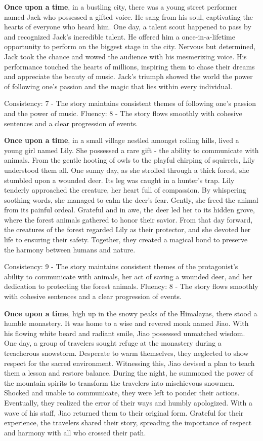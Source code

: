 \documentclass{article}
\begin{document}
\textbf{Once upon a time}, in a bustling city, there was a young street performer named Jack who possessed a gifted voice. He sang from his soul, captivating the hearts of everyone who heard him. One day, a talent scout happened to pass by and recognized Jack's incredible talent. He offered him a once-in-a-lifetime opportunity to perform on the biggest stage in the city. Nervous but determined, Jack took the chance and wowed the audience with his mesmerizing voice. His performance touched the hearts of millions, inspiring them to chase their dreams and appreciate the beauty of music. Jack's triumph showed the world the power of following one's passion and the magic that lies within every individual.

Consistency: 7 - The story maintains consistent themes of following one's passion and the power of music.
Fluency: 8 - The story flows smoothly with cohesive sentences and a clear progression of events.

\textbf{Once upon a time}, in a small village nestled amongst rolling hills, lived a young girl named Lily. She possessed a rare gift - the ability to communicate with animals. From the gentle hooting of owls to the playful chirping of squirrels, Lily understood them all. One sunny day, as she strolled through a thick forest, she stumbled upon a wounded deer. Its leg was caught in a hunter's trap. Lily tenderly approached the creature, her heart full of compassion. By whispering soothing words, she managed to calm the deer's fear. Gently, she freed the animal from its painful ordeal. Grateful and in awe, the deer led her to its hidden grove, where the forest animals gathered to honor their savior. From that day forward, the creatures of the forest regarded Lily as their protector, and she devoted her life to ensuring their safety. Together, they created a magical bond to preserve the harmony between humans and nature.

Consistency: 9 - The story maintains consistent themes of the protagonist's ability to communicate with animals, her act of saving a wounded deer, and her dedication to protecting the forest animals.
Fluency: 8 - The story flows smoothly with cohesive sentences and a clear progression of events.

\textbf{Once upon a time}, high up in the snowy peaks of the Himalayas, there stood a humble monastery. It was home to a wise and revered monk named Jiao. With his flowing white beard and radiant smile, Jiao possessed unmatched wisdom. One day, a group of travelers sought refuge at the monastery during a treacherous snowstorm. Desperate to warm themselves, they neglected to show respect for the sacred environment. Witnessing this, Jiao devised a plan to teach them a lesson and restore balance. During the night, he summoned the power of the mountain spirits to transform the travelers into mischievous snowmen. Shocked and unable to communicate, they were left to ponder their actions. Eventually, they realized the error of their ways and humbly apologized. With a wave of his staff, Jiao returned them to their original form. Grateful for their experience, the travelers shared their story, spreading the importance of respect and harmony with all who crossed their path.
\end{document}
